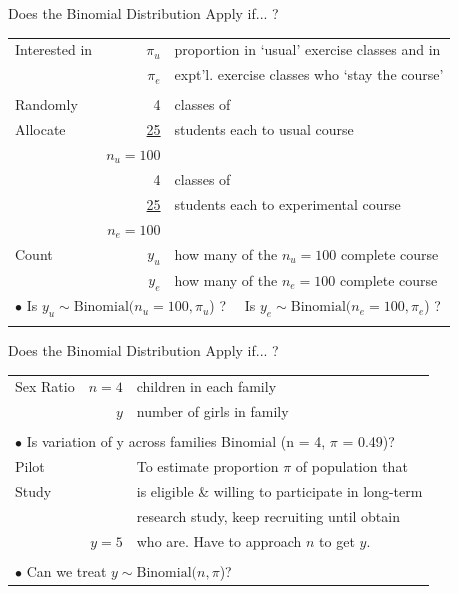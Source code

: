 \documentclass[handout]{beamer}\usepackage[]{graphicx}\usepackage[]{color}
\begin{document}
\begin{frame}{Does the Binomial Distribution Apply if... ?}

\small
\begin{tabular}{lrl}
	\hline
	
	Interested in & $\pi _{u}$      &   proportion in `usual' exercise classes and in  \\
	& $\pi _{e}$      &   expt'l. exercise classes who `stay the course'  \\
	& & \\
	Randomly & 4   & classes of\\ 
	Allocate    &  \underline{25} & students each to usual course \\
	& $n_{u} = 100$ &  \\
	& 4  & classes of\\
	&  \underline{25} & students each to experimental course \\
	& $n_{e} =100$ &  \\
	
	Count & $y_u$ & how many of the $n_{u}=100$ complete course \\
	& $y_e$ & how many of the $n_{e}=100$  complete course \\
	
	\multicolumn{3}{l}{$\bullet$ Is $y_{u} \sim \textrm{Binomial}(n_{u} = 100,  \pi _{u}$) ?
		\ \  Is $y_{e} \sim \textrm{Binomial}(n_{e} = 100,  \pi _{e}$) ?} \\
	& & \\
	\hline
\end{tabular}
\end{frame}



\begin{frame}{Does the Binomial Distribution Apply if... ?}

\small
\begin{tabular}{lrl}
	\hline
	Sex Ratio & $n=4$& children in each family  \\
	& $y$ & number of girls in family \\
	& & \\
	\multicolumn{3}{l}{$\bullet$ Is variation of y across families Binomial (n = 4, $\pi $ = 0.49)?} \\
	\hline
	Pilot  &   &To estimate proportion $\pi$ of population that\\ 
	Study&   &  is eligible \& willing to participate in long-term\\
	&   & research study, keep recruiting until obtain   \\
	& $y=5$ &  who are. Have to approach $n$ to get $y$. \\
	& & \\
	\multicolumn{3}{l}{$\bullet$ Can we treat $y \sim \textrm{Binomial}(n, \pi$)?} \\
	\hline
\end{tabular}
\end{frame}
\end{document}
